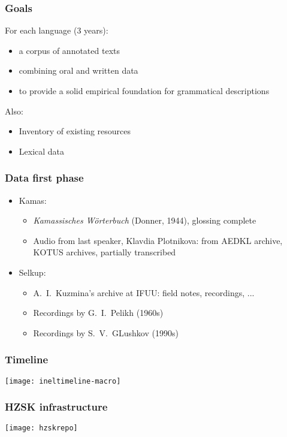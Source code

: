 \documentclass{beamer}
\begin{document}
\begin{frame}
    \frametitle{Goals}
    For each language (3 years):
    \begin{itemize}
        \item a corpus of annotated texts
        \item combining oral and written data
        \item to provide a solid empirical
            foundation for grammatical descriptions
    \end{itemize}
    Also:
    \begin{itemize}
        \item Inventory of existing resources
        \item Lexical data
    \end{itemize}
\end{frame}

\begin{frame}
    \frametitle{Data first phase}
    \begin{itemize}
        \item Kamas:
        \begin{itemize}
            \item \emph{Kamassisches Wörterbuch} (Donner, 1944),
                glossing complete
            \item Audio from last speaker, Klavdia Plotnikova: from AEDKL
                archive, KOTUS archives, partially transcribed
        \end{itemize}
        \item Selkup:
        \begin{itemize}
           \item A.~I.~Kuzmina's archive at IFUU: field notes, recordings, ...
           \item Recordings by G.~I.~Pelikh (1960s)
           \item Recordings by S.~V.~GLushkov (1990s)
        \end{itemize}
    \end{itemize}
\end{frame}

\begin{frame}
    \frametitle{Timeline}
    \texttt{[image: ineltimeline-macro]}
\end{frame}

\begin{frame}
    \frametitle{HZSK infrastructure}
    \texttt{[image: hzskrepo]}

\end{frame}
\end{document}
